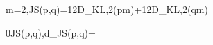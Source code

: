 m=2,\qquad JS(p,q)=\frac12D_{KL,2}(p\Vert m)+\frac12D_{KL,2}(q\Vert m)

0\le JS(p,q),\qquad d_{JS}(p,q)=
